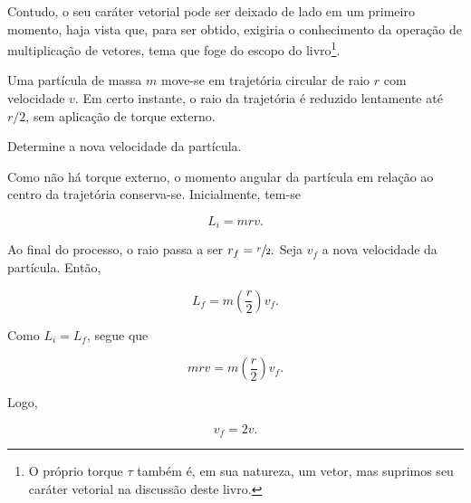 Contudo, o seu caráter vetorial pode ser deixado de lado em um primeiro momento, haja vista que, para ser obtido, exigiria o conhecimento da operação de multiplicação de vetores, tema que foge do escopo do livro\footnote{O próprio torque $\tau$ também é, em sua natureza, um vetor, mas suprimos seu caráter vetorial na discussão deste livro.}.


\vspace{0.3cm}

\begin{exemplo}\label{exemplo_rotacao_momentoangularex01}



Uma partícula de massa $m$ move-se em trajetória circular de raio $r$ com velocidade $v$. Em certo instante, o raio da trajetória é reduzido lentamente até $r/2$, sem aplicação de torque externo.

Determine a nova velocidade da partícula.

\resolucao

Como não há torque externo, o momento angular da partícula em relação ao centro da trajetória conserva-se. Inicialmente, tem-se

\[
L_i = mrv.
\]


Ao final do processo, o raio passa a ser $r_f = \sfrac{r}{2}.$ Seja $v_f$ a nova velocidade da partícula. Então,

\[
L_f = m\left(\frac{r}{2}\right)v_f.
\]


Como $L_i=L_f$, segue que

\[
mrv = m\left(\frac{r}{2}\right)v_f.
\]


Logo,

\[
\boxed{v_f = 2v.}
\]







\end{exemplo}


\vspace{0.3cm}



